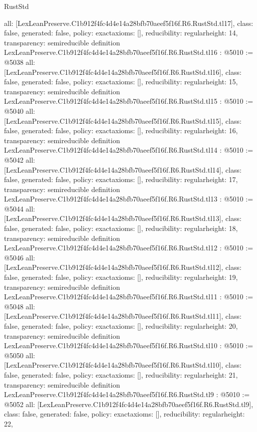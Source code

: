 \begin{lexlean}{RustStd}
\begin{coremodule}
{  all: [LexLeanPreserve.C1b912f4fc4d4e14a28bfb70aeef5f16f.R6.RustStd.tl17],
  class: false,
  generated: false,
  policy: exact{axioms: []},
  reducibility: regular{height: 14},
  transparency: semireducible
}
definition LexLeanPreserve.C1b912f4fc4d4e14a28bfb70aeef5f16f.R6.RustStd.tl16 : @5010 := @5038 {
  all: [LexLeanPreserve.C1b912f4fc4d4e14a28bfb70aeef5f16f.R6.RustStd.tl16],
  class: false,
  generated: false,
  policy: exact{axioms: []},
  reducibility: regular{height: 15},
  transparency: semireducible
}
definition LexLeanPreserve.C1b912f4fc4d4e14a28bfb70aeef5f16f.R6.RustStd.tl15 : @5010 := @5040 {
  all: [LexLeanPreserve.C1b912f4fc4d4e14a28bfb70aeef5f16f.R6.RustStd.tl15],
  class: false,
  generated: false,
  policy: exact{axioms: []},
  reducibility: regular{height: 16},
  transparency: semireducible
}
definition LexLeanPreserve.C1b912f4fc4d4e14a28bfb70aeef5f16f.R6.RustStd.tl14 : @5010 := @5042 {
  all: [LexLeanPreserve.C1b912f4fc4d4e14a28bfb70aeef5f16f.R6.RustStd.tl14],
  class: false,
  generated: false,
  policy: exact{axioms: []},
  reducibility: regular{height: 17},
  transparency: semireducible
}
definition LexLeanPreserve.C1b912f4fc4d4e14a28bfb70aeef5f16f.R6.RustStd.tl13 : @5010 := @5044 {
  all: [LexLeanPreserve.C1b912f4fc4d4e14a28bfb70aeef5f16f.R6.RustStd.tl13],
  class: false,
  generated: false,
  policy: exact{axioms: []},
  reducibility: regular{height: 18},
  transparency: semireducible
}
definition LexLeanPreserve.C1b912f4fc4d4e14a28bfb70aeef5f16f.R6.RustStd.tl12 : @5010 := @5046 {
  all: [LexLeanPreserve.C1b912f4fc4d4e14a28bfb70aeef5f16f.R6.RustStd.tl12],
  class: false,
  generated: false,
  policy: exact{axioms: []},
  reducibility: regular{height: 19},
  transparency: semireducible
}
definition LexLeanPreserve.C1b912f4fc4d4e14a28bfb70aeef5f16f.R6.RustStd.tl11 : @5010 := @5048 {
  all: [LexLeanPreserve.C1b912f4fc4d4e14a28bfb70aeef5f16f.R6.RustStd.tl11],
  class: false,
  generated: false,
  policy: exact{axioms: []},
  reducibility: regular{height: 20},
  transparency: semireducible
}
definition LexLeanPreserve.C1b912f4fc4d4e14a28bfb70aeef5f16f.R6.RustStd.tl10 : @5010 := @5050 {
  all: [LexLeanPreserve.C1b912f4fc4d4e14a28bfb70aeef5f16f.R6.RustStd.tl10],
  class: false,
  generated: false,
  policy: exact{axioms: []},
  reducibility: regular{height: 21},
  transparency: semireducible
}
definition LexLeanPreserve.C1b912f4fc4d4e14a28bfb70aeef5f16f.R6.RustStd.tl9 : @5010 := @5052 {
  all: [LexLeanPreserve.C1b912f4fc4d4e14a28bfb70aeef5f16f.R6.RustStd.tl9],
  class: false,
  generated: false,
  policy: exact{axioms: []},
  reducibility: regular{height: 22},
}
\end{coremodule}
\end{lexlean}
